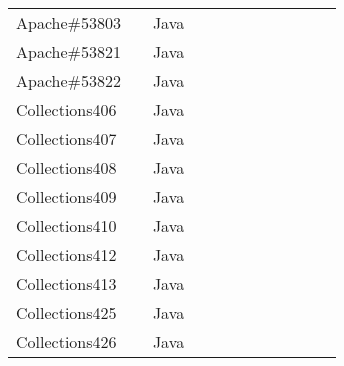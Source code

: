\begin{table*}
\begin{tabular}{lcccc|cccc|ccc}
Apache\#53803     &    & Java  &  &              &    &                                 &                   &                           &                        &   &        \\
Apache\#53821     &    & Java  &  &              &    &                                 &                   &                           &                        &   &        \\
Apache\#53822     &    & Java  &  &              &    &                                 &                   &                           &                        &   &        \\
\midrule
Collections406    &    & Java  &  &              &    &                                 &                   &                           &                        &   &        \\
Collections407    &    & Java  &  &              &    &                                 &                   &                           &                        &   &        \\
Collections408    &    & Java  &  &              &    &                                 &                   &                           &                        &   &        \\
Collections409    &    & Java  &  &              &    &                                 &                   &                           &                        &   &        \\
Collections410    &    & Java  &  &              &    &                                 &                   &                           &                        &   &        \\
Collections412    &    & Java  &  &              &    &                                 &                   &                           &                        &   &        \\
Collections413    &    & Java  &  &              &    &                                 &                   &                           &                        &   &        \\
Collections425    &    & Java  &  &              &    &                                 &                   &                           &                        &   &        \\
Collections426    &    & Java  &  &              &    &                                 &                   &                           &                        &   &        \\

\end{tabular}
\end{table*}

